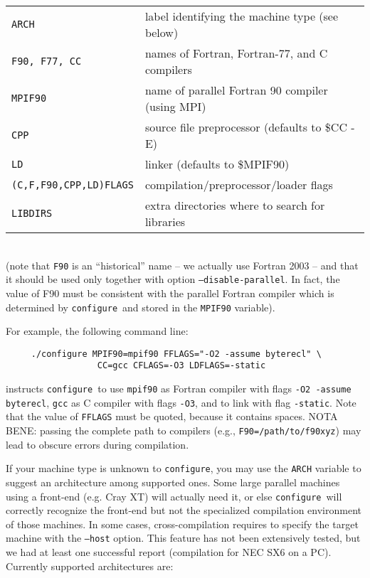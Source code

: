 \documentclass[12pt,a4paper]{article}
\def\configure{\texttt{configure}}
\begin{document}
\begin{tabular}{ll}
\texttt{ARCH}& label identifying the machine type (see below)\\
\texttt{F90, F77, CC} &names of Fortran, Fortran-77, and C compilers\\
\texttt{MPIF90} &       name of parallel Fortran 90 compiler (using MPI)\\
\texttt{CPP} &          source file preprocessor (defaults to \$CC -E)\\
\texttt{LD} &           linker (defaults to \$MPIF90)\\
\texttt{(C,F,F90,CPP,LD)FLAGS}& compilation/preprocessor/loader flags\\
\texttt{LIBDIRS}&     extra directories where to search for libraries\\
\end{tabular}\\
(note that \texttt{F90} is an ``historical'' name -- we actually use
Fortran 2003 -- and that it should be used only together with option
\texttt{--disable-parallel}. In fact, the value of F90 must be
consistent with the parallel Fortran compiler which is determined by
\configure\ and stored in the \texttt{MPIF90} variable).

For example, the following command line:
\begin{verbatim}
     ./configure MPIF90=mpif90 FFLAGS="-O2 -assume byterecl" \
                  CC=gcc CFLAGS=-O3 LDFLAGS=-static
\end{verbatim}
instructs \configure\ to use \texttt{mpif90} as Fortran compiler
with flags \texttt{-O2 -assume byterecl}, \texttt{gcc} as C compiler with
flags \texttt{-O3}, and to link with flag \texttt{-static}.
Note that the value of \texttt{FFLAGS} must be quoted, because it contains
spaces. NOTA BENE: passing the complete path to compilers (e.g.,
\texttt{F90=/path/to/f90xyz}) may lead to obscure errors during
compilation.

If your machine type is unknown to \configure, you may use the
\texttt{ARCH}
variable to suggest an architecture among supported ones. Some large
parallel machines using a front-end (e.g. Cray XT) will actually
need it, or else \configure\ will correctly recognize the front-end
but not the specialized compilation environment of those machines.
In some cases, cross-compilation requires to specify the target machine
with the \texttt{--host} option. This feature has not been extensively
tested, but we had at least one successful report (compilation
for NEC SX6 on a PC). Currently supported architectures are:
\end{document}
